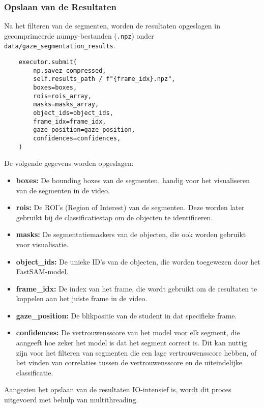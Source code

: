 \subsubsection{Opslaan van de Resultaten}

Na het filteren van de segmenten, worden de resultaten opgeslagen in gecomprimeerde numpy-bestanden 
(\texttt{.npz}) onder \texttt{data/gaze\_segmentation\_results}.

\begin{listing}[H]
  \begin{verbatim}
    executor.submit(
        np.savez_compressed,
        self.results_path / f"{frame_idx}.npz",
        boxes=boxes,
        rois=rois_array,
        masks=masks_array,
        object_ids=object_ids,
        frame_idx=frame_idx,
        gaze_position=gaze_position,
        confidences=confidences,
    )
    \end{verbatim}
  \caption[Opslaan van segmentatie-resultaten]{}
\end{listing}

De volgende gegevens worden opgeslagen:
\begin{itemize}
    \item \textbf{boxes:} De bounding boxes van de segmenten, handig voor het visualiseren van de segmenten in de video.
    \item \textbf{rois:} De ROI's (Region of Interest) van de segmenten. Deze worden later gebruikt bij de classificatiestap om de objecten te identificeren.
    \item \textbf{masks:} De segmentatiemaskers van de objecten, die ook worden gebruikt voor visualisatie.
    \item \textbf{object\_ids:} De unieke ID's van de objecten, die worden toegewezen door het FastSAM-model.
    \item \textbf{frame\_idx:} De index van het frame, die wordt gebruikt om de resultaten te koppelen aan het juiste frame in de video.
    \item \textbf{gaze\_position:} De blikpositie van de student in dat specifieke frame.
    \item \textbf{confidences:} De vertrouwensscore van het model voor elk segment, die aangeeft hoe zeker het model is dat het segment correct is.
    Dit kan nuttig zijn voor het filteren van segmenten die een lage vertrouwensscore hebben, 
    of het vinden van correlaties tussen de vertrouwensscore en de uiteindelijke classificatie.
\end{itemize}
Aangezien het opslaan van de resultaten IO-intensief is, wordt dit proces uitgevoerd met behulp van multithreading.

